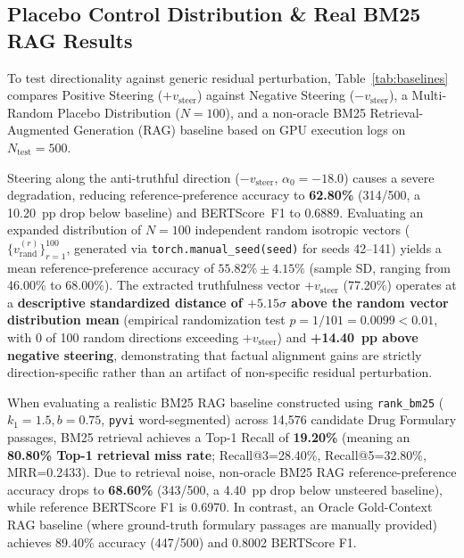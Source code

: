 \documentclass[conference]{IEEEtran}
\begin{document}
\subsection{Placebo Control Distribution \& Real BM25 RAG Results}
To test directionality against generic residual perturbation, Table~\ref{tab:baselines} compares Positive Steering ($+v_{\text{steer}}$) against Negative Steering ($-v_{\text{steer}}$), a Multi-Random Placebo Distribution ($N=100$), and a non-oracle BM25 Retrieval-Augmented Generation (RAG) baseline based on GPU execution logs on $N_{\text{test}}=500$.

Steering along the anti-truthful direction ($-v_{\text{steer}}$, $\alpha_0=-18.0$) causes a severe degradation, reducing reference-preference accuracy to \textbf{62.80\%} (314/500, a 10.20~pp drop below baseline) and BERTScore~F1 to 0.6889. Evaluating an expanded distribution of $N=100$ independent random isotropic vectors ($\{v_{\text{rand}}^{(r)}\}_{r=1}^{100}$, generated via \texttt{torch.manual\_seed(seed)} for seeds 42--141) yields a mean reference-preference accuracy of \textbf{$55.82\% \pm 4.15\%$} (sample SD, ranging from 46.00\% to 68.00\%). The extracted truthfulness vector $+v_{\text{steer}}$ (77.20\%) operates at a \textbf{descriptive standardized distance of $+5.15\sigma$ above the random vector distribution mean} (empirical randomization test $p=1/101=0.0099 < 0.01$, with 0 of 100 random directions exceeding $+v_{\text{steer}}$) and \textbf{+14.40~pp above negative steering}, demonstrating that factual alignment gains are strictly direction-specific rather than an artifact of non-specific residual perturbation.

When evaluating a realistic BM25 RAG baseline constructed using \texttt{rank\_bm25} ($k_1=1.5, b=0.75$, \texttt{pyvi} word-segmented) across 14,576 candidate Drug Formulary passages, BM25 retrieval achieves a Top-1 Recall of \textbf{19.20\%} (meaning an \textbf{80.80\% Top-1 retrieval miss rate}; Recall@3=28.40\%, Recall@5=32.80\%, MRR=0.2433). Due to retrieval noise, non-oracle BM25 RAG reference-preference accuracy drops to \textbf{68.60\%} (343/500, a 4.40~pp drop below unsteered baseline), while reference BERTScore F1 is 0.6970. In contrast, an Oracle Gold-Context RAG baseline (where ground-truth formulary passages are manually provided) achieves 89.40\% accuracy (447/500) and 0.8002 BERTScore F1.
\end{document}
